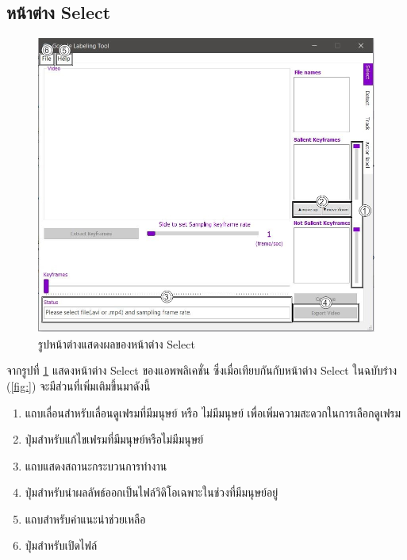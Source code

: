 \subsection*{หน้าต่าง Select}
\begin{figure}[!ht]
  \centering
    \includegraphics[scale=0.4]{chapter4/images/Final_ui/Select.jpg}
    \caption{รูปหน้าต่างแสดงผลของหน้าต่าง Select}
    \label{fig:final_select}
\end{figure}
จากรูปที่ \ref{fig:final_select} แสดงหน้าต่าง Select ของแอพพลิเคชั่น ซึ่งเมื่อเทียบกันกับหน้าต่าง Select ในฉบับร่าง (\ref{fig:}) จะมีส่วนที่เพิ่มเติมขึ้นมาดังนี้
\begin{enumerate}
	\item แถบเลื่อนสำหรับเลื่อนดูเฟรมที่มีมนุษย์ หรือ ไม่มีมนุษย์ เพื่อเพิ่มความสะดวกในการเลือกดูเฟรม
	\item ปุ่มสำหรับแก้ไขเฟรมที่มีมนุษย์หรือไม่มีมนุษย์
	\item แถบแสดงสถานะกระบวนการทำงาน
	\item ปุ่มสำหรับนำผลลัพธ์ออกเป็นไฟล์วิดิโอเฉพาะในช่วงที่มีมนุษย์อยู่
	\item แถบสำหรับคำแนะนำช่วยเหลือ
	\item ปุ่มสำหรับเปิดไฟล์
\end{enumerate}		

\clearpage
